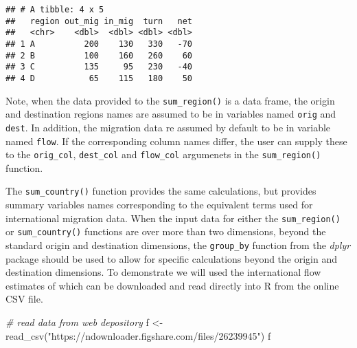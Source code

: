 \documentclass[
]{book}
\newenvironment{Shaded}{\begin{snugshade}}{\end{snugshade}}
\newcommand{\CommentTok}[1]{\textcolor[rgb]{0.56,0.35,0.01}{\textit{#1}}}
\newcommand{\FunctionTok}[1]{\textcolor[rgb]{0.00,0.00,0.00}{#1}}
\newcommand{\NormalTok}[1]{#1}
\newcommand{\OtherTok}[1]{\textcolor[rgb]{0.56,0.35,0.01}{#1}}
\newcommand{\StringTok}[1]{\textcolor[rgb]{0.31,0.60,0.02}{#1}}
\begin{document}
\begin{verbatim}
## # A tibble: 4 x 5
##   region out_mig in_mig  turn   net
##   <chr>    <dbl>  <dbl> <dbl> <dbl>
## 1 A          200    130   330   -70
## 2 B          100    160   260    60
## 3 C          135     95   230   -40
## 4 D           65    115   180    50
\end{verbatim}

Note, when the data provided to the \texttt{sum\_region()} is a data frame, the origin and destination regions names are assumed to be in variables named \texttt{orig} and \texttt{dest}. In addition, the migration data re assumed by default to be in variable named \texttt{flow}. If the corresponding column names differ, the user can supply these to the \texttt{orig\_col}, \texttt{dest\_col} and \texttt{flow\_col} argumenets in the \texttt{sum\_region()} function.

The \texttt{sum\_country()} function provides the same calculations, but provides summary variables names corresponding to the equivalent terms used for international migration data. When the input data for either the \texttt{sum\_region()} or \texttt{sum\_country()} functions are over more than two dimensions, beyond the standard origin and destination dimensions, the \texttt{group\_by} function from the \emph{dplyr} package should be used to allow for specific calculations beyond the origin and destination dimensions. To demonstrate we will used the international flow estimates of \citet{Abel2019} which can be downloaded and read directly into R from the online CSV file.

\begin{Shaded}
\begin{Highlighting}[]
\CommentTok{\# read data from web depository}
\NormalTok{f }\OtherTok{\textless{}{-}} \FunctionTok{read\_csv}\NormalTok{(}\StringTok{"https://ndownloader.figshare.com/files/26239945"}\NormalTok{)}
\NormalTok{f}
\end{Highlighting}
\end{Shaded}
\end{document}
